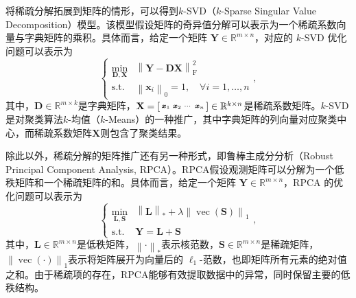 将稀疏分解拓展到矩阵的情形，可以得到\( k \)-SVD（\( k \)-Sparse Singular Value Decomposition）模型。该模型假设矩阵的奇异值分解可以表示为一个稀疏系数向量与字典矩阵的乘积。具体而言，给定一个矩阵 \( \mathbf{Y} \in \mathbb{R}^{m \times n} \)，对应的 \( k \)-SVD 优化问题可以表示为
\begin{equation}
    \begin{cases}
        \min_{\mathbf{D}, \mathbf{X}} & \left\| \mathbf{Y} - \mathbf{D} \mathbf{X} \right\|_{\mathrm{F}}^2 \\
        \text{s.t.}                   & \left\| \bm{x}_i \right\|_0 = 1, \quad \forall i = 1, \ldots, n
    \end{cases},
    \label{eq:k-svd}
\end{equation}
其中，\( \mathbf{D} \in \mathbb{R}^{m \times k} \)是字典矩阵，\( \mathbf{X} =
\begin{bsmallmatrix} \boldsymbol{x}_1 & \boldsymbol{x}_2 & \cdots & \boldsymbol{x}_n
\end{bsmallmatrix} \in \mathbb{R}^{k \times n} \)是稀疏系数矩阵。\( k \)-SVD是对聚类算法\( k \)-均值（\( k \)-Means）的一种推广，其中字典矩阵的列向量对应聚类中心，而稀疏系数矩阵\( \mathbf{X} \)则包含了聚类结果。

除此以外，稀疏分解的矩阵推广还有另一种形式，即鲁棒主成分分析（Robust Principal Component Analysis, RPCA）。RPCA假设观测矩阵可以分解为一个低秩矩阵和一个稀疏矩阵的和。具体而言，给定一个矩阵 \( \mathbf{Y} \in \mathbb{R}^{m \times n} \)，RPCA 的优化问题可以表示为
\begin{equation}
    \begin{cases}
        \min_{\mathbf{L}, \mathbf{S}} & \left\| \mathbf{L} \right\|_* + \lambda \left\| \operatorname{vec}(\mathbf{S})\right\|_1 \\
        \text{s.t.}                   & \mathbf{Y} = \mathbf{L} + \mathbf{S}
    \end{cases},
    \label{eq:rpca}
\end{equation}
其中，\( \mathbf{L} \in \mathbb{R}^{m \times n} \)是低秩矩阵，\( \left\| \cdot \right\|_* \)表示核范数，\( \mathbf{S} \in \mathbb{R}^{m \times n} \)是稀疏矩阵，\( \left\| \operatorname{vec}(\cdot)\right\|_1 \)表示将矩阵展开为向量后的 \( \ell_1 \)-范数，也即矩阵所有元素的绝对值之和。由于稀疏项的存在，RPCA能够有效提取数据中的异常，同时保留主要的低秩结构。

